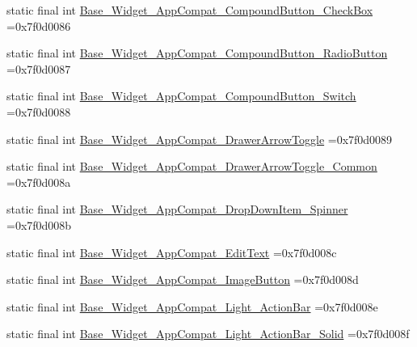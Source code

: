 \begin{DoxyCompactItemize}
\item 
static final int \mbox{\hyperlink{classbr_1_1unb_1_1cic_1_1mp_1_1marketmaster_1_1R_1_1style_a8850e434f9ec06b013ed00f5f238caa0}{Base\+\_\+\+Widget\+\_\+\+App\+Compat\+\_\+\+Compound\+Button\+\_\+\+Check\+Box}} =0x7f0d0086
\item 
static final int \mbox{\hyperlink{classbr_1_1unb_1_1cic_1_1mp_1_1marketmaster_1_1R_1_1style_ace29f87e9e1506c236ca39e36d03a063}{Base\+\_\+\+Widget\+\_\+\+App\+Compat\+\_\+\+Compound\+Button\+\_\+\+Radio\+Button}} =0x7f0d0087
\item 
static final int \mbox{\hyperlink{classbr_1_1unb_1_1cic_1_1mp_1_1marketmaster_1_1R_1_1style_a6bfed5a613ce78381e29085e154b2e68}{Base\+\_\+\+Widget\+\_\+\+App\+Compat\+\_\+\+Compound\+Button\+\_\+\+Switch}} =0x7f0d0088
\item 
static final int \mbox{\hyperlink{classbr_1_1unb_1_1cic_1_1mp_1_1marketmaster_1_1R_1_1style_a45de8341d8cdce14f1c93007a99d0e38}{Base\+\_\+\+Widget\+\_\+\+App\+Compat\+\_\+\+Drawer\+Arrow\+Toggle}} =0x7f0d0089
\item 
static final int \mbox{\hyperlink{classbr_1_1unb_1_1cic_1_1mp_1_1marketmaster_1_1R_1_1style_ab0455e04ac628269b5eb101245051d25}{Base\+\_\+\+Widget\+\_\+\+App\+Compat\+\_\+\+Drawer\+Arrow\+Toggle\+\_\+\+Common}} =0x7f0d008a
\item 
static final int \mbox{\hyperlink{classbr_1_1unb_1_1cic_1_1mp_1_1marketmaster_1_1R_1_1style_ab448b51539d1799d370821486edf3dc2}{Base\+\_\+\+Widget\+\_\+\+App\+Compat\+\_\+\+Drop\+Down\+Item\+\_\+\+Spinner}} =0x7f0d008b
\item 
static final int \mbox{\hyperlink{classbr_1_1unb_1_1cic_1_1mp_1_1marketmaster_1_1R_1_1style_a6dd3d3d0fc38701fd6c19f438af834d2}{Base\+\_\+\+Widget\+\_\+\+App\+Compat\+\_\+\+Edit\+Text}} =0x7f0d008c
\item 
static final int \mbox{\hyperlink{classbr_1_1unb_1_1cic_1_1mp_1_1marketmaster_1_1R_1_1style_aea3a9cb37a5e6bba0ceaaa51b5b011a2}{Base\+\_\+\+Widget\+\_\+\+App\+Compat\+\_\+\+Image\+Button}} =0x7f0d008d
\item 
static final int \mbox{\hyperlink{classbr_1_1unb_1_1cic_1_1mp_1_1marketmaster_1_1R_1_1style_a6619b6edc6c971964504a3320a5aeb8c}{Base\+\_\+\+Widget\+\_\+\+App\+Compat\+\_\+\+Light\+\_\+\+Action\+Bar}} =0x7f0d008e
\item 
static final int \mbox{\hyperlink{classbr_1_1unb_1_1cic_1_1mp_1_1marketmaster_1_1R_1_1style_a96a117825fbec31ff6a52f9407991ce1}{Base\+\_\+\+Widget\+\_\+\+App\+Compat\+\_\+\+Light\+\_\+\+Action\+Bar\+\_\+\+Solid}} =0x7f0d008f

\end{DoxyCompactItemize}
